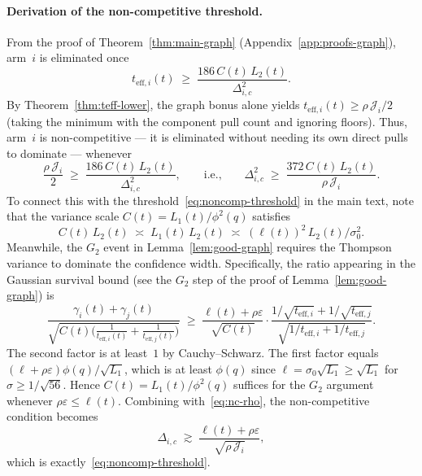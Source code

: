 \documentclass{article}
\begin{document}
\paragraph{Derivation of the non-competitive threshold.}

From the proof of Theorem~\ref{thm:main-graph}
(Appendix~\ref{app:proofs-graph}), arm~$i$ is eliminated once
\begin{equation}
\label{eq:elim-general}
t_{\mathrm{eff},i}(t)
\;\ge\;
\frac{186\,C(t)\,L_2(t)}{\Delta_{i,c}^2}.
\end{equation}
By Theorem~\ref{thm:teff-lower}, the graph bonus alone yields
$t_{\mathrm{eff},i}(t)\ge\rho\,\mathcal J_i/2$ (taking the minimum with the
component pull count and ignoring floors). Thus, arm~$i$ is non-competitive ---
it is eliminated without needing its own direct pulls to dominate --- whenever
\begin{equation}
\label{eq:nc-rho}
\frac{\rho\,\mathcal J_i}{2}
\;\ge\;
\frac{186\,C(t)\,L_2(t)}{\Delta_{i,c}^2},
\qquad\text{i.e.,}\qquad
\Delta_{i,c}^2
\;\ge\;
\frac{372\,C(t)\,L_2(t)}{\rho\,\mathcal J_i}.
\end{equation}
To connect this with the threshold~\eqref{eq:noncomp-threshold} in the main
text, note that the variance scale $C(t)=L_1(t)/\phi^2(q)$ satisfies
\[
C(t)\,L_2(t)
\;\asymp\;
L_1(t)\,L_2(t)
\;\asymp\;
(\ell(t))^2\,L_2(t)/\sigma_0^2.
\]
Meanwhile, the $G_2$ event in Lemma~\ref{lem:good-graph} requires the
Thompson variance to dominate the confidence width. Specifically, the ratio
appearing in the Gaussian survival bound (see the $G_2$ step of the proof of
Lemma~\ref{lem:good-graph}) is
\[
\frac{\gamma_i(t)+\gamma_j(t)}
{\sqrt{C(t)\bigl(\tfrac{1}{t_{\mathrm{eff},i}(t)}+\tfrac{1}{t_{\mathrm{eff},j}(t)}\bigr)}}
\;\ge\;
\frac{\ell(t)+\rho\varepsilon}{\sqrt{C(t)}}
\cdot
\frac{1/\sqrt{t_{\mathrm{eff},i}}+1/\sqrt{t_{\mathrm{eff},j}}}
     {\sqrt{1/t_{\mathrm{eff},i}+1/t_{\mathrm{eff},j}}}.
\]
The second factor is at least~$1$ by Cauchy--Schwarz. The first factor equals
$(\ell+\rho\varepsilon)\phi(q)/\sqrt{L_1}$, which is at least $\phi(q)$ since
$\ell=\sigma_0\sqrt{L_1}\ge\sqrt{L_1}$ for $\sigma\ge 1/\sqrt{56}$. Hence
$C(t)=L_1(t)/\phi^2(q)$ suffices for the $G_2$ argument whenever
$\rho\varepsilon\le\ell(t)$. Combining with~\eqref{eq:nc-rho}, the
non-competitive condition becomes
\[
\Delta_{i,c}
\;\gtrsim\;
\frac{\ell(t)+\rho\varepsilon}{\sqrt{\rho\,\mathcal J_i}},
\]
which is exactly~\eqref{eq:noncomp-threshold}.
\end{document}
